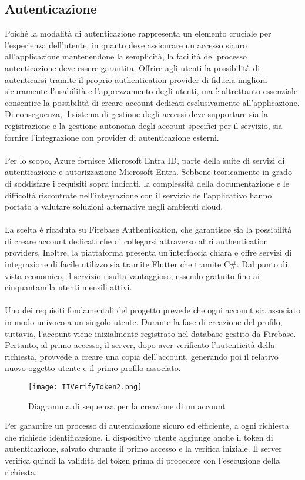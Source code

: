 \subsection{Autenticazione}


Poiché la modalità di autenticazione rappresenta un elemento cruciale per l’esperienza dell’utente, 
in quanto deve assicurare un accesso sicuro all’applicazione mantenendone la semplicità, la facilità del processo autenticazione deve essere garantita.
Offrire agli utenti la possibilità di autenticarsi tramite il proprio authentication provider di fiducia migliora sicuramente l’usabilità e l’apprezzamento degli utenti, 
ma è altrettanto essenziale consentire la possibilità di creare account dedicati esclusivamente all’applicazione.
Di conseguenza, il sistema di gestione degli accessi deve supportare sia la registrazione e la gestione autonoma degli account specifici per il servizio, 
sia fornire l'integrazione con provider di autenticazione esterni.\\
\\
Per lo scopo, Azure fornisce Microsoft Entra ID, parte della suite di servizi di autenticazione e autorizzazione Microsoft Entra. 
Sebbene teoricamente in grado di soddisfare i requisiti sopra indicati, 
la complessità della documentazione e le difficoltà riscontrate nell’integrazione con il servizio dell’applicativo
 hanno portato a valutare soluzioni alternative negli ambienti cloud.\\
\\
La scelta è ricaduta su Firebase Authentication, che garantisce sia la possibilità di creare account dedicati che di collegarsi attraverso altri authentication providers. 
Inoltre, la piattaforma presenta un’interfaccia chiara e offre servizi di integrazione di facile utilizzo sia tramite Flutter che tramite C\#.
Dal punto di vista economico, il servizio risulta vantaggioso, essendo gratuito fino ai cinquantamila utenti mensili attivi.\\
\\
Uno dei requisiti fondamentali del progetto prevede che ogni account sia associato in modo univoco a un singolo utente. 
Durante la fase di creazione del profilo, tuttavia, l’account viene inizialmente registrato nel database gestito da Firebase. 
Pertanto, al primo accesso, il server, dopo aver verificato l’autenticità della richiesta, provvede a creare una copia dell’account, 
generando poi il relativo nuovo oggetto utente e il primo profilo associato.\\
\clearpage
\begin{figure}[h!]
    \centering
    \texttt{[image: IIVerifyToken2.png]}
    \caption{Diagramma di sequenza per la creazione di un account}
\end{figure}
Per garantire un processo di autenticazione sicuro ed efficiente, a ogni richiesta che richiede identificazione, 
il dispositivo utente aggiunge anche il token di autenticazione, salvato durante il primo accesso e la verifica iniziale. 
Il server verifica quindi la validità del token prima di procedere con l'esecuzione della richiesta.

